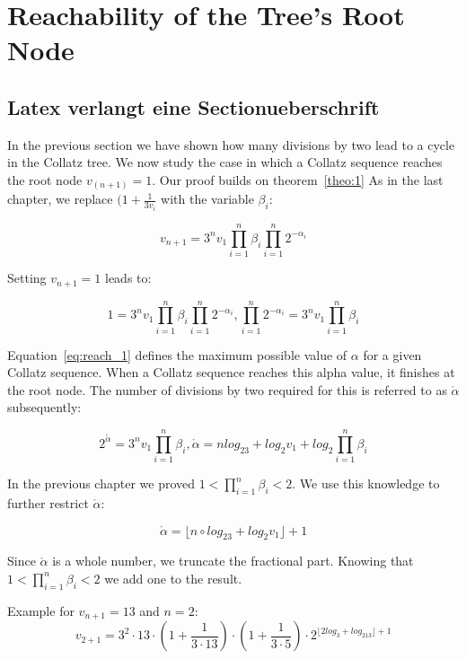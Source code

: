 \chapter{Reachability of the Tree's Root Node}

\section{Latex verlangt eine Sectionueberschrift}
In the previous section we have shown how many divisions by two lead to a cycle in the Collatz tree. We now study the case in which a Collatz sequence reaches the root node $v_(n+1)=1$. Our proof builds on theorem~\ref{theo:1} As in the last chapter, we replace $(1+\frac{1}{3v_i}$ with the variable $\beta_i$:

\[
v_{n+1}=3^nv_1\prod_{i=1}^{n}\beta_i\prod_{i=1}^{n}2^{-\alpha_i}
\]

Setting $v_{n+1}=1$ leads to:

\begin{equation}
\label{eq:reach_1}
1=3^nv_1\prod_{i=1}^{n}\beta_i\prod_{i=1}^{n}2^{-\alpha_i}, \prod_{i=1}^{n}2^{-\alpha_i}=3^nv_1\prod_{i=1}^{n}\beta_i
\end{equation}

Equation~\ref{eq:reach_1} defines the maximum possible value of $\alpha$ for a given Collatz sequence. When a Collatz sequence reaches this alpha value, it finishes at the root node. The number of divisions by two required for this is referred to as $\mathring\alpha$ subsequently:

\[
2^{\mathring\alpha}=3^nv_1\prod_{i=1}^{n}\beta_i,
\mathring\alpha=nlog_23+log_2v_1+log_2\prod_{i=1}^{n}\beta_i
\]

In the previous chapter we proved $1<\prod_{i=1}^{n}\beta_i<2$. We use this knowledge to further restrict $\mathring\alpha$:

\begin{equation}
\label{eq:reach_2}
\mathring\alpha=\lfloor n\circ log_23+log_2v_1\rfloor+1
\end{equation}

Since $\mathring\alpha$ is a whole number, we truncate the fractional part. Knowing that $1<\prod_{i=1}^{n}\beta_i<2$ we add one to the result.

\begin{example}
Example for $v_{n+1}=13$ and $n=2$:
\[
v_{2+1}=3^2\cdot13\cdot\left(1+\frac{1}{3\cdot13}\right)\cdot\left(1+\frac{1}{3\cdot5}\right)\cdot2^{\lfloor2log_3+log_213\rfloor+1}
\]
\end{example}

